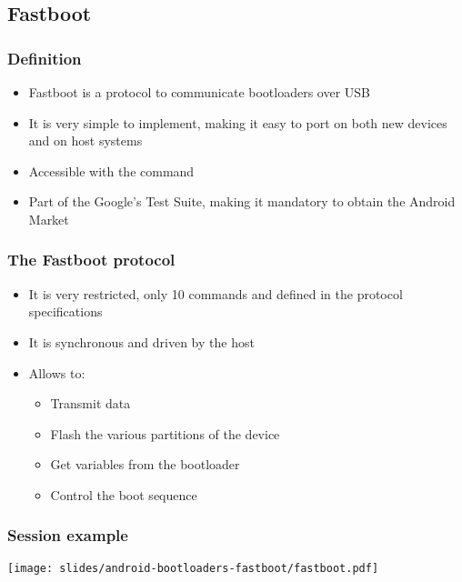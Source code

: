 \subsection{Fastboot}
\begin{frame}
  \frametitle{Definition}
  \begin{itemize}
  \item Fastboot is a protocol to communicate bootloaders over
    USB
  \item It is very simple to implement, making it easy to port on
    both new devices and on host systems
  \item Accessible with the  command
  \item Part of the Google's Test Suite, making it mandatory to obtain the
    Android Market
  \end{itemize}
\end{frame}

\begin{frame}
  \frametitle{The Fastboot protocol}
  \begin{itemize}
  \item It is very restricted, only 10 commands and defined in the
    protocol specifications
  \item It is synchronous and driven by the host
  \item Allows to:
    \begin{itemize}
      \item Transmit data
      \item Flash the various partitions of the device
      \item Get variables from the bootloader
      \item Control the boot sequence
    \end{itemize}
  \end{itemize}
\end{frame}

\begin{frame}
  \frametitle{Session example}
  \begin{center}
    \texttt{[image: slides/android-bootloaders-fastboot/fastboot.pdf]}
  \end{center}
\end{frame}

